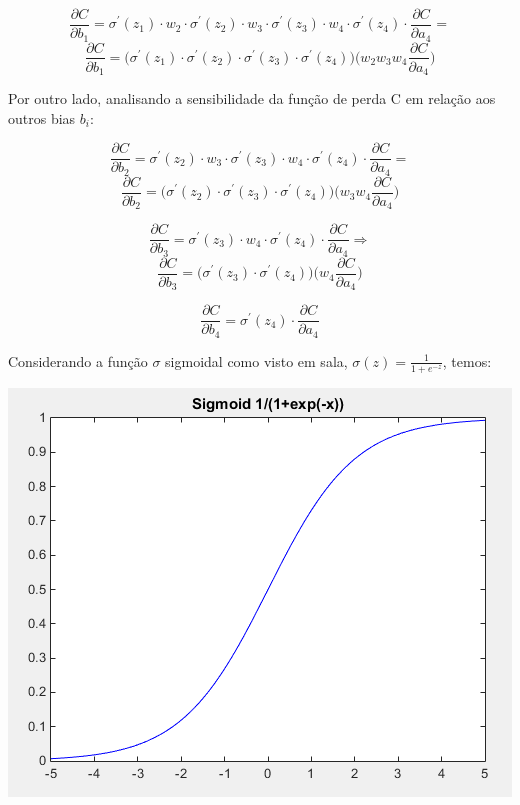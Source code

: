 \documentclass[
	12pt,				%
	oneside,			%
	a4paper,			%
	english,			%
	french,				%
	spanish,			%
	brazil,				%
	]{abntex2}
\begin{document}
$$ \frac{\partial C}{\partial b_1} = \sigma^{'}(z_1) \cdot w_2 \cdot \sigma^{'}(z_2) \cdot w_3 \cdot \sigma^{'}(z_3) \cdot w_4 \cdot  \sigma^{'}(z_4)\cdot\frac{\partial C}{\partial a_4} = $$
$$\frac{\partial C}{\partial b_1} =\bigg( \sigma^{'}(z_1) \cdot \sigma^{'}(z_2) \cdot \sigma^{'}(z_3) \cdot \sigma^{'}(z_4) \bigg)\bigg( w_2 w_3 w_4 \frac{\partial C}{\partial a_4}\bigg) $$

Por outro lado, analisando a sensibilidade da fun\c{c}\~ao de perda C em rela\c{c}\~ao aos outros bias $b_i$:

$$ \frac{\partial C}{\partial b_2} = \sigma^{'}(z_2) \cdot w_3 \cdot \sigma^{'}(z_3) \cdot w_4 \cdot  \sigma^{'}(z_4)\cdot\frac{\partial C}{\partial a_4} = $$
$$ \frac{\partial C}{\partial b_2} = \bigg( \sigma^{'}(z_2) \cdot \sigma^{'}(z_3) \cdot \sigma^{'}(z_4) \bigg)\bigg( w_3 w_4 \frac{\partial C}{\partial a_4}\bigg) $$

$$ \frac{\partial C}{\partial b_3} = \sigma^{'}(z_3) \cdot w_4 \cdot  \sigma^{'}(z_4)\cdot\frac{\partial C}{\partial a_4} \Rightarrow $$
$$\frac{\partial C}{\partial b_3} = \bigg( \sigma^{'}(z_3) \cdot \sigma^{'}(z_4) \bigg)\bigg( w_4 \frac{\partial C}{\partial a_4}\bigg) $$

$$ \frac{\partial C}{\partial b_4} =  \sigma^{'}(z_4)\cdot\frac{\partial C}{\partial a_4} $$

Considerando a fun\c{c}\~ao $\sigma$ sigmoidal como visto em sala, $\sigma(z) = \frac{1}{1 + e^{-z}}$, temos:

\begin{center}
	\includegraphics[scale=0.8]{plotsig.png}
\end{center}
\end{document}
